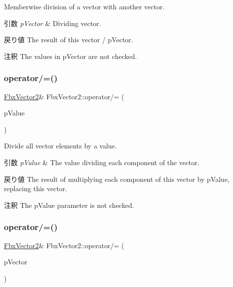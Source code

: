 Memberwise division of a vector with another vector. 
\begin{DoxyParams}{引数}
{\em p\+Vector} & Dividing vector. \\
\hline
\end{DoxyParams}
\begin{DoxyReturn}{戻り値}
The result of this vector / p\+Vector. 
\end{DoxyReturn}
\begin{DoxyRemark}{注釈}
The values in p\+Vector are not checked. 
\end{DoxyRemark}
\mbox{\label{class_fbx_vector2_a3d60afc7bacc3f7db4b455b2aae7d6ec}} 
\subsubsection{\texorpdfstring{operator/=()}{operator/=()}\hspace{0.1cm}{\footnotesize\ttfamily [1/2]}}
{\footnotesize\ttfamily \hyperlink{class_fbx_vector2}{Fbx\+Vector2}\& Fbx\+Vector2\+::operator/= (\begin{DoxyParamCaption}\item[{double}]{p\+Value }\end{DoxyParamCaption})}

Divide all vector elements by a value. 
\begin{DoxyParams}{引数}
{\em p\+Value} & The value dividing each component of the vector. \\
\hline
\end{DoxyParams}
\begin{DoxyReturn}{戻り値}
The result of multiplying each component of this vector by p\+Value, replacing this vector. 
\end{DoxyReturn}
\begin{DoxyRemark}{注釈}
The p\+Value parameter is not checked. 
\end{DoxyRemark}
\mbox{\label{class_fbx_vector2_ab5cb65076098583d38293fd01311decb}} 
\subsubsection{\texorpdfstring{operator/=()}{operator/=()}\hspace{0.1cm}{\footnotesize\ttfamily [2/2]}}
{\footnotesize\ttfamily \hyperlink{class_fbx_vector2}{Fbx\+Vector2}\& Fbx\+Vector2\+::operator/= (\begin{DoxyParamCaption}\item[{const \hyperlink{class_fbx_vector2}{Fbx\+Vector2} \&}]{p\+Vector }\end{DoxyParamCaption})}

